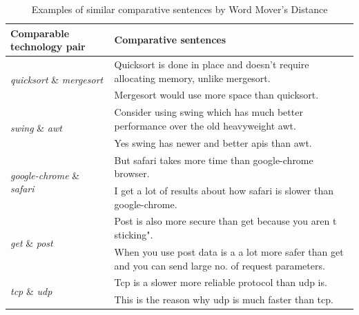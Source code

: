 \begin{table}
	\centering
	\caption{Examples of similar comparative sentences by Word Mover's Distance}
	\vspace{-3mm}
	\begin{tabular}{l|l}
	\hline
	\textbf{Comparable technology pair} & \textbf{Comparative sentences} \\ \hline
	\multirow{2}{*}{\textit{quicksort} \& \textit{mergesort}} & Quicksort is done in place and doesn’t require allocating memory, unlike mergesort. \\ & Mergesort would use more space than quicksort. \\ \hline
	\multirow{2}{*}{\textit{swing} \& \textit{awt}} & Consider using swing which has much better performance over the old heavyweight awt. \\ & Yes swing has newer and better apis than awt. \\ \hline
	\multirow{2}{*}{\textit{google-chrome} \& \textit{safari}} & But safari takes more time than google-chrome browser. \\ &  I get a lot of results about how safari is slower than google-chrome. \\ \hline
	\multirow{2}{*}{\textit{get} \& \textit{post}} & Post is also more secure than get because you aren t sticking". \\ & When you use post data is a a lot more safer than get and you can send large no. of request parameters. \\ \hline
	\multirow{2}{*}{\textit{tcp} \& \textit{udp}} & Tcp is a slower more reliable protocol than udp is. \\ & This is the reason why udp is much faster than tcp. \\ \hline
	\end{tabular}
	\vspace{-1mm}
	\label{tab:wmd}
\end{table}
	

